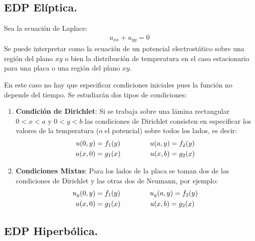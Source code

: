 \subsection{EDP Elíptica.}

Sea la ecuación de Laplace:
\begin{align*}
u_{xx} + u_{yy} = 0
\end{align*}
Se puede interpretar como la ecuación de un potencial electrostático sobre una región del plano $xy$ o bien la distribución de temperatura en el caso estacionario para una placa o una región del plano $xy$.
\par
En este caso no hay que especificar condiciones iniciales pues la función no depende del tiempo. Se estudiarán dos tipos de condiciones:
\begin{enumerate}
\item \textbf{Condición de Dirichlet}: Si se trabaja sobre una lámina rectangular $0 < x < a$ y $0 < y < b$ las condiciones de Dirichlet consisten en especificar los valores de la temperatura (o el potencial) sobre todos los lados, es decir:
\begin{align}
\begin{aligned}
u (0, y) &= f_{1} (y) \hspace{1.5cm} u (a, y) = f_{2} (y) \\
u (x, 0) &= g_{1} (x) \hspace{1.5cm} u (x, b) = g_{2} (x)
\end{aligned}
\label{eq:ecuacion_06_02_05}
\end{align}
\item \textbf{Condiciones Mixtas}: Para los lados de la placa se toman dos de las condiciones de Dirichlet y las otras dos de Neumann, por ejemplo:
\begin{align}
\begin{aligned}
u_{y} (0, y) &= f_{1} (y) \hspace{1.5cm} u_{y} (a, y) = f_{2} (y) \\
u (x, 0) &= g_{1} (x) \hspace{1.5cm} u (x, b) = g_{2} (x)
\end{aligned}
\label{eq:ecuacion_06_01_06}
\end{align}
\end{enumerate}

\subsection{EDP Hiperbólica.}

